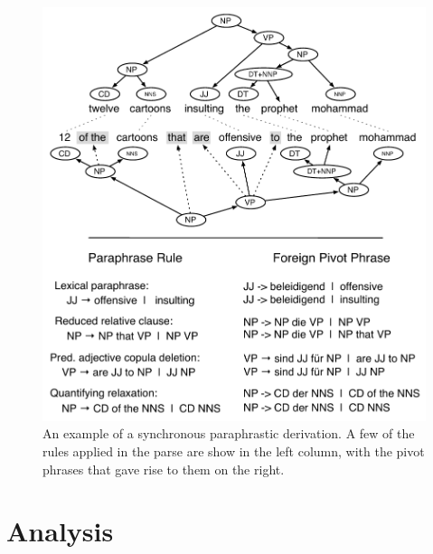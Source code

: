 \documentclass[11pt]{article}
\begin{document}
\begin{figure}[!t]
\begin{center}
\includegraphics[width=0.99\linewidth]{figures/example_compression_1col.pdf}
\end{center}
\caption{An example of a synchronous paraphrastic derivation. A few of
  the rules applied in the parse are show in the left column, with the
  pivot phrases that gave rise to them on the
  right.}\label{paraphrase_derivaton}
\end{figure}

\section{Analysis} \label{analysis}
\end{document}
